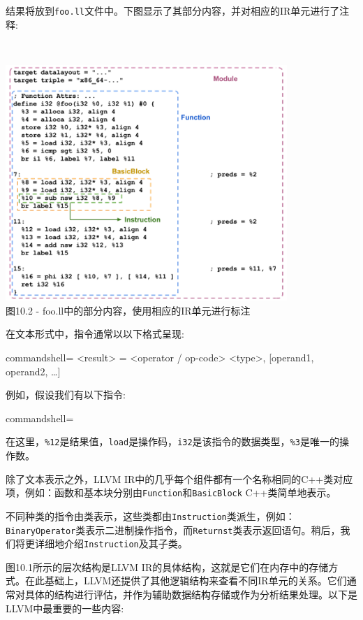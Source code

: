 结果将放到\texttt{foo.ll}文件中。下图显示了其部分内容，并对相应的IR单元进行了注释:

\hspace*{\fill} \\ %
\begin{center}
\includegraphics[width=0.8\textwidth]{content/3/chapter10/images/2.png}\\
图10.2 - foo.ll中的部分内容，使用相应的IR单元进行标注
\end{center}

在文本形式中，指令通常以以下格式呈现:

\begin{tcblisting}{commandshell={}}
<result> = <operator / op-code> <type>, [operand1, operand2, …]
\end{tcblisting}

例如，假设我们有以下指令:

\begin{tcblisting}{commandshell={}}
\end{tcblisting}

在这里，\texttt{\%12}是结果值，\texttt{load}是操作码，\texttt{i32}是该指令的数据类型，\texttt{\%3}是唯一的操作数。

除了文本表示之外，LLVM IR中的几乎每个组件都有一个名称相同的C++类对应项，例如：函数和基本块分别由\texttt{Function}和\texttt{BasicBlock} C++类简单地表示。

不同种类的指令由类表示，这些类都由\texttt{Instruction}类派生，例如：\texttt{BinaryOperator}类表示二进制操作指令，而\texttt{Returnst}类表示返回语句。稍后，我们将更详细地介绍\texttt{Instruction}及其子类。

图10.1所示的层次结构是LLVM IR的具体结构，这就是它们在内存中的存储方式。在此基础上，LLVM还提供了其他逻辑结构来查看不同IR单元的关系。它们通常对具体的结构进行评估，并作为辅助数据结构存储或作为分析结果处理。以下是LLVM中最重要的一些内容:

